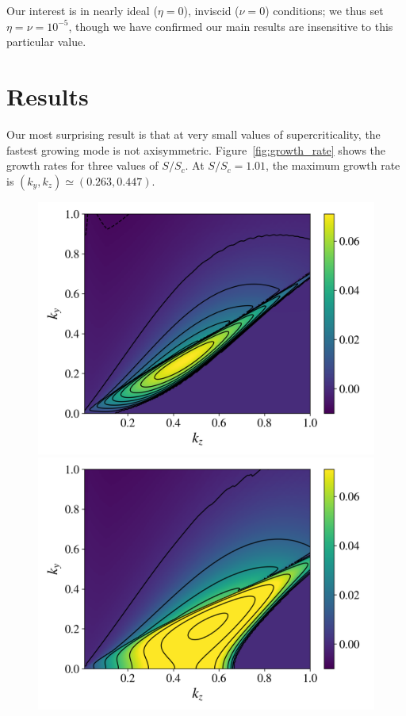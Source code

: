 \documentclass[aps,prl, reprint,superscriptaddress]{revtex4-1}
\newcommand{\SSC}{S/S_{c}}
\begin{document}
Our interest is in nearly ideal ($\eta = 0$), inviscid ($\nu = 0$) conditions; we thus set $\eta=\nu=10^{-5}$, though we have confirmed our main results are insensitive to this particular value. 

\section{Results}
\label{sec:results}
Our most surprising result is that at very small values of supercriticality, the fastest growing mode is not axisymmetric. Figure~\ref{fig:growth_rate} shows the growth rates for three values of $\SSC$. At $\SSC = 1.01$, the maximum growth rate is $(k_y, k_z) \simeq (0.263, 0.447)$. 

\begin{figure}[h]
  \includegraphics[width=\columnwidth]{run_11_output_growthrates.png}
  \includegraphics[width=\columnwidth]{run_12_output_growthrates.png}

\end{figure}
\end{document}
